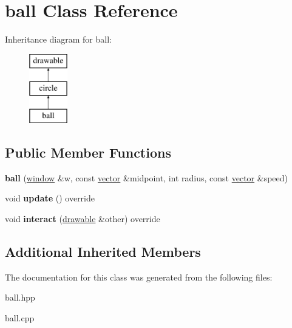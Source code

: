 \hypertarget{classball}{}\section{ball Class Reference}
\label{classball}
Inheritance diagram for ball\+:\begin{figure}[H]
\begin{center}
\leavevmode
\includegraphics[height=3.000000cm]{classball}
\end{center}
\end{figure}
\subsection*{Public Member Functions}
\begin{DoxyCompactItemize}
\item 
\mbox{\label{classball_a6fd1d27603e0ce43a922422fb651520e}} 
{\bfseries ball} (\hyperlink{classwindow}{window} \&w, const \hyperlink{classvector}{vector} \&midpoint, int radius, const \hyperlink{classvector}{vector} \&speed)
\item 
\mbox{\label{classball_a5f291c177cdb80ae8d7c1f9328edbc6e}} 
void {\bfseries update} () override
\item 
\mbox{\label{classball_a719362bf5934da38138a65693c02a593}} 
void {\bfseries interact} (\hyperlink{classdrawable}{drawable} \&other) override
\end{DoxyCompactItemize}
\subsection*{Additional Inherited Members}


The documentation for this class was generated from the following files\+:\begin{DoxyCompactItemize}
\item 
ball.\+hpp\item 
ball.\+cpp\end{DoxyCompactItemize}
